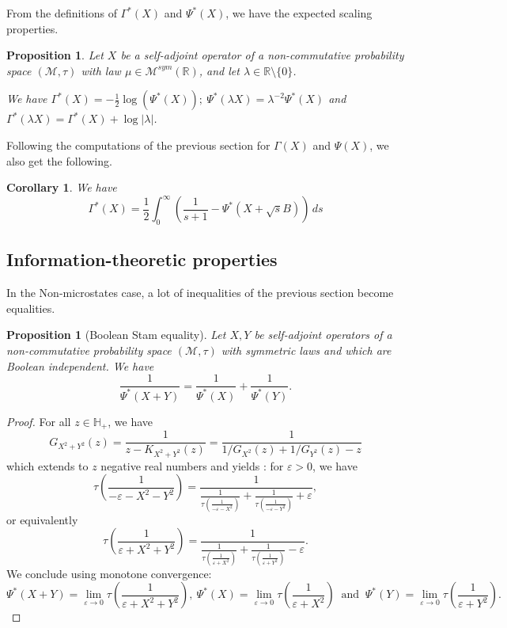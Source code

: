 \documentclass[10pt, reqno]{amsart}
\numberwithin{equation}{section}
\theoremstyle{definition}
\theoremstyle{plain}
\newtheorem{proposition}[definition]{Proposition}
\newtheorem{corollary}[definition]{Corollary}
\theoremstyle{remark}
\newcommand{\R}{\mathbb{R}}
\newcommand{\1}{\mathbbm{1}}
\begin{document}
    

From the definitions of $\Gamma^*(X)$ and $\Psi^*(X)$, we have the expected scaling properties.
\begin{proposition}
    Let $X$ be a self-adjoint operator of a non-commutative probability space $(\mathcal{M},\tau)$ with law $\mu\in\mathcal{M}^{sym}(\R)$, and let $\lambda\in \mathbb{R}\setminus \{0\}$.
    
    We have $\Gamma^*(X)=-\frac{1}{2}\log(\Psi^*(X));\ \Psi^*(\lambda X) =\lambda^{-2} \Psi^*(X)$ and $ \Gamma^*(\lambda X) = \Gamma^*(X) + \log |\lambda|$.
\end{proposition}

Following the computations of the previous section for $\Gamma(X)$ and $\Psi(X)$, we also get the following.

	\begin{corollary}\label{Entfisher*}
		We have
		\begin{equation}
			\Gamma^*(X)=\frac{1}{2} \int_0^\infty \left( \frac{1}{s+1}-\Psi^*(X+\sqrt{s}B) \right)\,ds
		\end{equation}
	\end{corollary}
\subsection{Information-theoretic properties}\label{Sec2:booleanentropy*}
In the Non-microstates case, a lot of inequalities of the previous section become equalities.
	\begin{proposition}
	    [Boolean Stam equality]\label{Corbooleanstam*}
	Let $X,Y$ be self-adjoint operators of a non-commutative probability space $(\mathcal{M},\tau)$ with symmetric laws and which are Boolean independent. We have
	\begin{equation}\label{Voistam*}
		\frac{1}{\Psi^*(X+Y)}=\frac{1}{\Psi^*(X)} + \frac{1}{\Psi^*(Y)}.
	\end{equation}
	\end{proposition}
\begin{proof}
For all $z\in \mathbb{H}_+$, we have
$$
       G_{X^2+Y^2}(z)=\frac{1}{z-K_{X^2+Y^2}(z)}
        =\frac{1}{1/G_{X^2}(z)+1/G_{Y^2}(z)-z}
$$
    which extends to $z$ negative real numbers and yields : for $\varepsilon >0$, we have
    $$\tau\left(\frac{1}{-\varepsilon-X^2-Y^2}\right)=\frac{1}{\frac{1}{\tau\left(\frac{1}{-\varepsilon-X^2}\right)}+\frac{1}{\tau\left(\frac{1}{-\varepsilon-Y^2}\right)}+\varepsilon},$$
    or equivalently
    $$\tau\left(\frac{1}{\varepsilon+X^2+Y^2}\right)=\frac{1}{\frac{1}{\tau\left(\frac{1}{\varepsilon+X^2}\right)}+\frac{1}{\tau\left(\frac{1}{\varepsilon+Y^2}\right)}-\varepsilon}.$$
    We conclude using monotone convergence:
    $$\Psi^*(X+Y)=\lim_{\varepsilon\to 0}\tau\left(\frac{1}{\varepsilon+X^2+Y^2}\right),\ \Psi^*(X)=\lim_{\varepsilon\to 0}\tau\left(\frac{1}{\varepsilon+X^2}\right)\ \text{ and }\ \Psi^*(Y)=\lim_{\varepsilon\to 0}\tau\left(\frac{1}{\varepsilon+Y^2}\right).$$
\end{proof}
\end{document}
